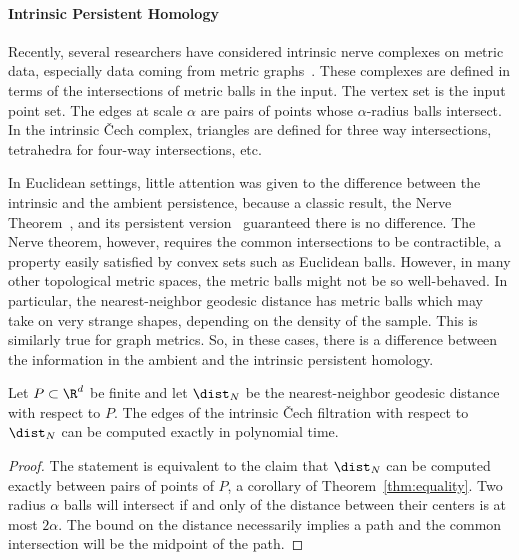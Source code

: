 

  \paragraph*{Intrinsic Persistent Homology}
    Recently, several researchers have considered intrinsic nerve complexes on metric data, especially data coming from metric graphs~\cite{adamszek16nerve,gasparovic17complete}.
    These complexes are defined in terms of the intersections of metric balls in the input.
    The vertex set is the input point set.
    The edges at scale $\alpha$ are pairs of points whose $\alpha$-radius balls intersect.
    In the intrinsic \v Cech complex, triangles are defined for three way intersections, tetrahedra for four-way intersections, etc.

    In Euclidean settings, little attention was given to the difference between the intrinsic and the ambient persistence, because a classic result, the Nerve Theorem~\cite{borsuk48imbedding}, and its persistent version~\cite{chazal08towards} guaranteed there is no difference.
    The Nerve theorem, however, requires the common intersections to be contractible, a property easily satisfied by convex sets such as Euclidean balls.
    However, in many other topological metric spaces, the metric
    balls might not be so well-behaved.
    In particular, the nearest-neighbor geodesic distance has metric balls which may take on very strange shapes, depending on the density of the sample.
    This is similarly true for graph metrics.
    So, in these cases, there is a difference between the information in the ambient and the intrinsic persistent homology.

    \begin{theorem}
      Let $P\subset \R^d$ be finite and let $\dist_N$ be the nearest-neighbor geodesic distance with respect to $P$.
      The edges of the intrinsic \v Cech filtration with respect to $\dist_N$ can be computed exactly in polynomial time.
    \end{theorem}
    \begin{proof}
      The statement is equivalent to the claim that $\dist_N$ can be computed exactly between pairs of points of $P$, a corollary of Theorem~\ref{thm:equality}.
      Two radius $\alpha$ balls will intersect if and only of the distance between their centers is at most $2\alpha$.
      The bound on the distance necessarily implies a path and the common intersection will be the midpoint of the path.
    \end{proof}
